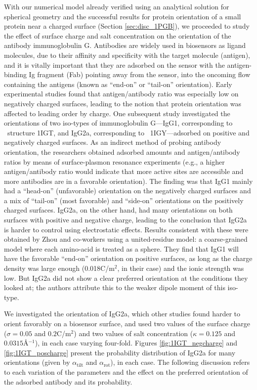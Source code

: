  With our numerical model already verified using an analytical solution for spherical geometry\cite{CooperBarba2015a} and the successful results for protein orientation of a small protein near a charged surface (Section \ref{sec:disc_1PGB}), we proceeded to study the effect of surface charge and salt concentration on the orientation of the antibody immunoglobulin G. Antibodies are widely used in biosensors as ligand molecules, due to their affinity and specificity with the target molecule (antigen), and it is vitally important that they are adsorbed on the sensor with the antigen-binding Ig fragment (Fab) pointing away from the sensor, into the oncoming flow containing the antigens (known as ``end-on'' or ``tail-on'' orientation).
Early experimental studies found that antigen/antibody ratio was especially low on negatively charged surfaces,\cite{BuijsETal1997} leading to the notion that protein orientation was affected to leading order by charge. 
One subsequent study\cite{ChenLiuZhouJiang2003} investigated the orientations of two iso-types of immunoglobulin G---IgG1, corresponding to \pdb\ structure {\small 1IGT}, and IgG2a, corresponding to \pdb\ {\small 1IGY}---adsorbed on positive and negatively charged surfaces. 
As an indirect method of probing antibody orientation, the researchers obtained adsorbed amounts and antigen/antibody ratios by means of surface-plasmon resonance experiments (e.g., a higher antigen/antibody ratio would indicate that more active sites are accessible and more antibodies are in a favorable orientation). 
The finding was that IgG1 mainly had a ``head-on'' (unfavorable) orientation on the negatively charged surfaces and a mix of ``tail-on'' (most favorable) and ``side-on'' orientations on the positively charged surfaces. 
IgG2a, on the other hand, had many orientations on both surfaces with positive and negative charge, leading to the conclusion that IgG2a is harder to control using electrostatic effects.
Results consistent with these were obtained by Zhou and co-workers\cite{ZhouChenJiang2003} using a united-residue model: a coarse-grained model where each amino-acid is treated as a sphere. They find that IgG1 will have the favorable ``end-on'' orientation on positive surfaces, as long as the charge density was large enough (0.018C/m$^{2}$, in their case) and the ionic strength was low. But IgG2a  did not show a clear preferred orientation at the conditions they looked at; the authors attribute this to the weaker dipole moment of this iso-type.
 
We investigated the orientation of IgG2a, which other studies found harder to orient favorably on a biosensor surface, and used two values of the surface charge ($\sigma=0.05$ and $0.2$C/m$^{2}$) and two values of salt concentration ($\kappa=0.125$ and $0.0315$\AA$^{-1}$), in each case varying four-fold.
 Figures \ref{fig:1IGT_negcharge} and \ref{fig:1IGT_poscharge} present the probability distribution of IgG2a for many orientations (given by $\alpha_\text{tilt}$ and $\alpha_\text{rot}$), in each case.
 The following discussion refers to each variation of the parameters and the effect on the preferred orientation of the adsorbed antibody and its probability.

